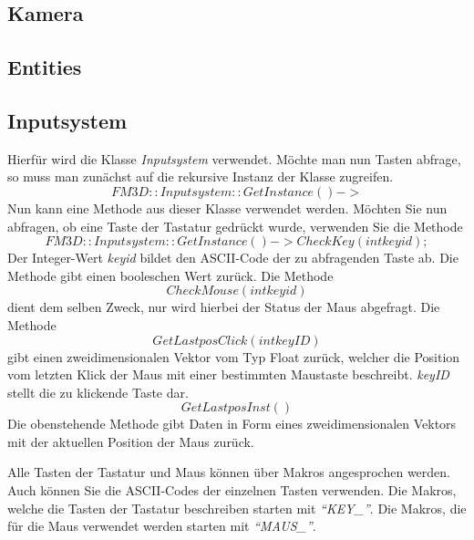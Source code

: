 \subsection{Kamera}

\subsection{Entities}

\subsection{Inputsystem}
\label{inputsystemver}
Hierfür wird die Klasse \textit{Inputsystem} verwendet. Möchte man nun Tasten abfrage, so muss man zunächst auf die rekursive Instanz der Klasse zugreifen. 
$$FM3D::Inputsystem::GetInstance()->$$
Nun kann eine Methode aus dieser Klasse verwendet werden.
Möchten Sie nun abfragen, ob eine Taste der Tastatur gedrückt wurde, verwenden Sie die Methode
$$FM3D::Inputsystem::GetInstance()->CheckKey(int  keyid);$$
Der Integer-Wert \textit{keyid} bildet den ASCII-Code der zu abfragenden Taste ab. Die Methode gibt einen booleschen Wert zurück. Die Methode $$CheckMouse(int  keyid)$$ dient dem selben Zweck, nur wird hierbei der Status der Maus abgefragt.
Die Methode $$GetLastposClick(int keyID)$$
gibt einen zweidimensionalen Vektor vom Typ Float zurück, welcher die Position vom letzten Klick der Maus mit einer bestimmten Maustaste beschreibt. \textit{keyID} stellt die zu klickende Taste dar. 
$$GetLastposInst()$$
Die obenstehende Methode gibt Daten in Form eines zweidimensionalen Vektors mit der aktuellen Position der Maus zurück.

Alle Tasten der Tastatur und Maus können über Makros angesprochen werden. Auch können Sie die ASCII-Codes der einzelnen Tasten verwenden. Die Makros, welche die Tasten der Tastatur beschreiben starten mit \textit{"`KEY\_"'}. Die Makros, die für die Maus verwendet werden starten mit \textit{"`MAUS\_"'}.
